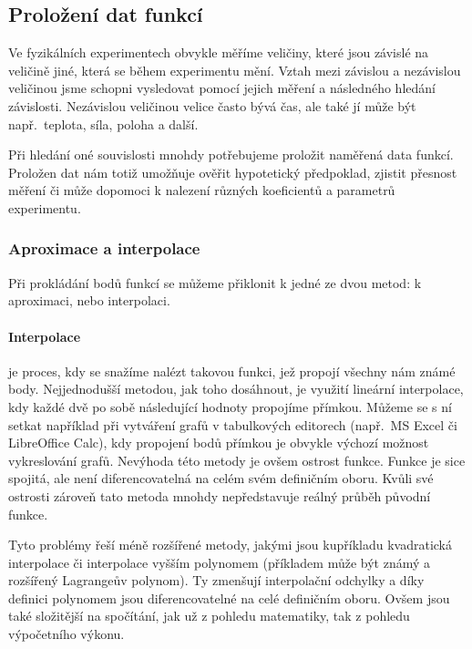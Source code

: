 \newcommand{\nsum}{\sum^n_{i=1}}
\newcommand{\nsumx}{\sum^n_{i=1}x_i}
\newcommand{\nsumy}{\sum^n_{i=1}y_i}
\newcommand{\nsumxx}{\sum^n_{i=1}x_i^2}
\newcommand{\nsumxy}{\sum^n_{i=1}x_iy_i}

\subsection{Proložení dat funkcí}
Ve fyzikálních experimentech obvykle měříme veličiny, které jsou závislé na
veličině jiné, která se během experimentu mění. Vztah mezi závislou a
nezávislou veličinou jsme schopni vysledovat pomocí jejich měření a následného
hledání závislosti.  Nezávislou veličinou velice často bývá čas, ale také jí
může být např.~teplota, síla, poloha a další.\cite{praktikum}
 
Při hledání oné souvislosti mnohdy potřebujeme proložit naměřená data funkcí.
Proložen dat nám totiž umožňuje ověřit hypotetický předpoklad, zjistit přesnost
měření či může dopomoci k nalezení různých koeficientů a parametrů experimentu.

\subsubsection{Aproximace a interpolace}
Při prokládání bodů funkcí se můžeme přiklonit k jedné ze dvou metod: k
aproximaci, nebo interpolaci.

\paragraph{Interpolace} je proces, kdy se snažíme nalézt takovou funkci, jež propojí
všechny nám známé body. Nejjednodušší metodou, jak toho dosáhnout, je využití
lineární interpolace, kdy každé dvě po sobě následující hodnoty propojíme
přímkou. Můžeme se s ní setkat například při vytváření grafů v tabulkových
editorech (např.~MS Excel či LibreOffice Calc), kdy propojení bodů přímkou je
obvykle výchozí možnost vykreslování grafů. 
Nevýhoda této metody je ovšem ostrost funkce. Funkce je sice spojitá, ale není
diferencovatelná na celém svém definičním oboru. Kvůli své ostrosti zároveň
tato metoda mnohdy nepředstavuje reálný průběh původní funkce.

Tyto problémy řeší méně rozšířené metody, jakými jsou kupříkladu kvadratická
interpolace či interpolace vyšším polynomem (příkladem může být známý a
rozšířený Lagrangeův polynom). Ty zmenšují interpolační odchylky a díky
definici polynomem jsou diferencovatelné na celé definičním oboru. Ovšem jsou
také složitější na spočítání, jak už z pohledu matematiky, tak z pohledu
výpočetního výkonu.

